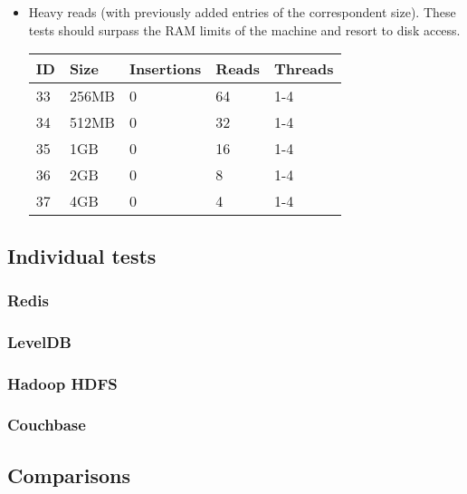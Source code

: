 \documentclass[11pt]{article}
\begin{document}
\begin{itemize}
\item Heavy reads (with previously added entries of the correspondent size). These tests should surpass the RAM limits of the machine and resort to disk access.
\begin{center}
    \begin{tabular}{| p{0.45cm} | p{2.5cm} | p{1.75cm} | p{1.25cm} | p{1.5cm} |}
    \hline
    ID & Size & Insertions & Reads & Threads
    \\ \hline
    33 & 256MB & 0 & 64 & 1-4
    \\ \hline
    34 & 512MB & 0 & 32 & 1-4
    \\ \hline
    35 & 1GB & 0 & 16 & 1-4
    \\ \hline
    36 & 2GB & 0 & 8 & 1-4
    \\ \hline
    37 & 4GB & 0 & 4 & 1-4
    \\ \hline
    \end{tabular}
\end{center}

\end{itemize}

\subsection{Individual tests}
\subsubsection{Redis}
\subsubsection{LevelDB}
\subsubsection{Hadoop HDFS}
\subsubsection{Couchbase}
\subsection{Comparisons}
\end{document}
